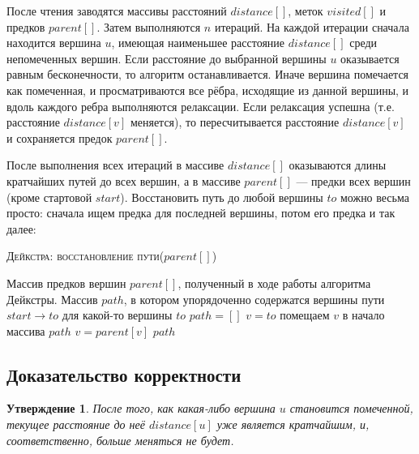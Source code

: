 \documentclass[a4paper,12pt]{article}
\newcommand{\algname}[1]{\textsc{#1}}
\newtheorem*{statement}{Утверждение}
\begin{document}
После чтения заводятся массивы расстояний $distance[]$, меток $visited[]$ и предков $parent[]$. Затем выполняются $n$ итераций. На каждой итерации сначала находится вершина $u$, имеющая наименьшее расстояние $distance[]$ среди непомеченных вершин. Если расстояние до выбранной вершины $u$ оказывается равным бесконечности, то алгоритм останавливается. Иначе вершина помечается как помеченная, и просматриваются все рёбра, исходящие из данной вершины, и вдоль каждого ребра выполняются релаксации. Если релаксация успешна (т.е. расстояние $distance[v]$ меняется), то пересчитывается расстояние $distance[v]$ и сохраняется предок $parent[]$.

После выполнения всех итераций в массиве $distance[]$ оказываются длины кратчайших путей до всех вершин, а в массиве $parent[]$ — предки всех вершин (кроме стартовой $start$). Восстановить путь до любой вершины $to$ можно весьма просто: сначала ищем предка для последней вершины, потом его предка и так далее:

\begin{algorithm}
  	\caption{\algname{Дейкстра: восстановление пути}($parent[]$)}
	\begin{algorithmic}
	    \Require Массив предков вершин $parent[]$, полученный в ходе работы алгоритма Дейкстры.
	    \Ensure Массив $path$, в котором упорядоченно содержатся вершины пути $start \to to$ для какой-то вершины $to$
	    \State 
	    \State $path = []$
	    \State $v = to$
	        \State помещаем $v$ в начало массива $path$
	        \State $v = parent[v]$
	   \EndWhile
	   \Return $path$
	\end{algorithmic}
\end{algorithm}

\subsection{Доказательство корректности}

\begin{statement}
После того, как какая-либо вершина $u$ становится помеченной, текущее расстояние до неё $distance[u]$ уже является кратчайшим, и, соответственно, больше меняться не будет.
\end{statement} 
\end{document}
